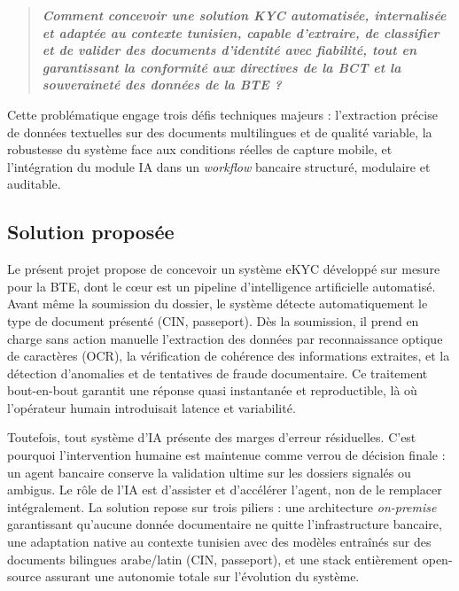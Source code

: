\begin{quote}
\textit{\textbf{Comment concevoir une solution KYC automatisée, internalisée et adaptée au contexte tunisien, capable d'extraire, de classifier et de valider des documents d'identité avec fiabilité, tout en garantissant la conformité aux directives de la BCT et la souveraineté des données de la BTE ?}}
\end{quote}

Cette problématique engage trois défis techniques majeurs : l'extraction précise de données textuelles sur des documents multilingues et de qualité variable, la robustesse du système face aux conditions réelles de capture mobile, et l'intégration du module IA dans un \textit{workflow} bancaire structuré, modulaire et auditable.

\subsection{Solution proposée}
\label{subsec:solution-proposee}

Le présent projet propose de concevoir un système eKYC développé sur mesure pour la BTE, dont le c\oe{}ur est un pipeline d'intelligence artificielle automatisé. Avant même la soumission du dossier, le système détecte automatiquement le type de document présenté (CIN, passeport). Dès la soumission, il prend en charge sans action manuelle l'extraction des données par reconnaissance optique de caractères (OCR), la vérification de cohérence des informations extraites, et la détection d'anomalies et de tentatives de fraude documentaire. Ce traitement bout-en-bout garantit une réponse quasi instantanée et reproductible, là où l'opérateur humain introduisait latence et variabilité.

Toutefois, tout système d'IA présente des marges d'erreur résiduelles. C'est pourquoi l'intervention humaine est maintenue comme verrou de décision finale : un agent bancaire conserve la validation ultime sur les dossiers signalés ou ambigus. Le rôle de l'IA est d'assister et d'accélérer l'agent, non de le remplacer intégralement. La solution repose sur trois piliers : une architecture \textit{on-premise} garantissant qu'aucune donnée documentaire ne quitte l'infrastructure bancaire, une adaptation native au contexte tunisien avec des modèles entraînés sur des documents bilingues arabe/latin (CIN, passeport), et une stack entièrement open-source assurant une autonomie totale sur l'évolution du système.


